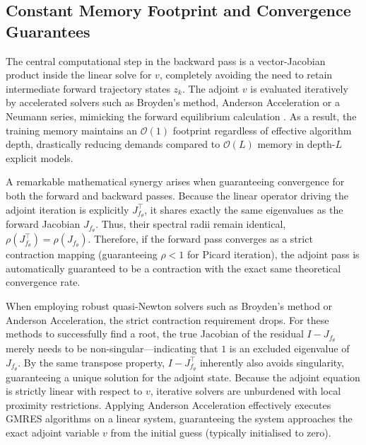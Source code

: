 \subsection{Constant Memory Footprint and Convergence Guarantees}
The central computational step in the backward pass is a vector-Jacobian product inside the linear solve for $v$, completely avoiding the need to retain intermediate forward trajectory states $z_k$. The adjoint $v$ is evaluated iteratively by accelerated solvers such as Broyden's method, Anderson Acceleration or a Neumann series, mimicking the forward equilibrium calculation \cite{bai2019deep, gilton2021deep}. As a result, the training memory maintains an $\mathcal{O}(1)$ footprint regardless of effective algorithm depth, drastically reducing demands compared to $\mathcal{O}(L)$ memory in depth-$L$ explicit models.

A remarkable mathematical synergy arises when guaranteeing convergence for both the forward and backward passes. Because the linear operator driving the adjoint iteration is explicitly $J_{f_\theta}^{\top}$, it shares exactly the same eigenvalues as the forward Jacobian $J_{f_\theta}$. Thus, their spectral radii remain identical, $\rho(J_{f_\theta}^{\top}) = \rho(J_{f_\theta})$. Therefore, if the forward pass converges as a strict contraction mapping (guaranteeing $\rho < 1$ for Picard iteration), the adjoint pass is automatically guaranteed to be a contraction with the exact same theoretical convergence rate.

When employing robust quasi-Newton solvers such as Broyden's method or Anderson Acceleration, the strict contraction requirement drops. For these methods to successfully find a root, the true Jacobian of the residual $I - J_{f_\theta}$ merely needs to be non-singular—indicating that $1$ is an excluded eigenvalue of $J_{f_\theta}$. By the same transpose property, $I - J_{f_\theta}^{\top}$ inherently also avoids singularity, guaranteeing a unique solution for the adjoint state. Because the adjoint equation is strictly linear with respect to $v$, iterative solvers are unburdened with local proximity restrictions. Applying Anderson Acceleration effectively executes GMRES algorithms on a linear system, guaranteeing the system approaches the exact adjoint variable $v$ from the initial guess (typically initialised to zero).

